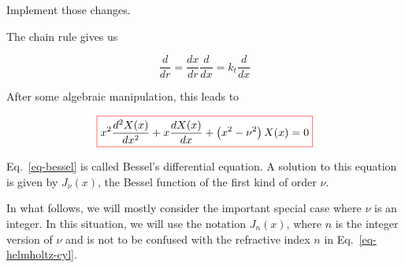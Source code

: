 \begin{cue}
Implement those changes.
\end{cue}

The chain rule gives us

\begin{equation}
 \frac{d}{d r} =  \frac{dx}{dr}  \frac{d}{d x}= k_t \frac{d}{d x} 
\end{equation}

After some algebraic manipulation, this leads to

\begin{equation}
\fbox{$\displaystyle
x^2\frac{d^2 X(x)}{d x^2} + x \frac{d X(x)}{d x} + \left(x ^ 2 - \nu^2 \right)X(x) = 0 \label{eq-bessel}
$}
\end{equation}

\noindent{}Eq.~\ref{eq-bessel} is called Bessel's differential equation. A solution to this equation is given by $J_\nu(x)$, the Bessel function of the first kind of order $\nu$.

In what follows, we will mostly consider the important special case where $\nu$ is an integer. In this situation, we will use the notation $J_n(x)$, where $n$ is the integer version of $\nu$ and is not to be confused with the refractive index $n$ in Eq.~\ref{eq-helmholtz-cyl}.


\pagebreak



